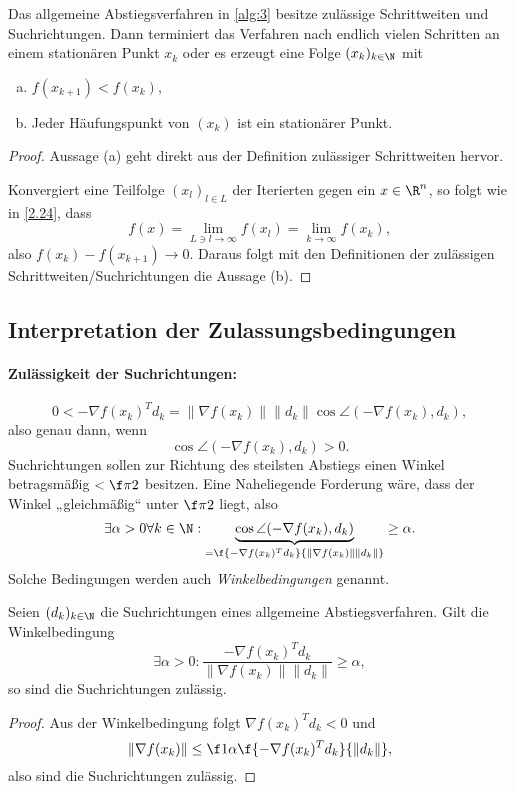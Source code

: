 \begin{st} \label{2.29}
	Das allgemeine Abstiegsverfahren in \ref{alg:3} besitze zulässige Schrittweiten und Suchrichtungen.
	Dann terminiert das Verfahren nach endlich vielen Schritten an einem stationären Punkt $x_k$ oder es erzeugt eine Folge $(x_k)_{k\in\N}$ mit
	\begin{enumerate}[(a)]
		\item
			$f(x_{k+1}) < f(x_k)$,
		\item
			Jeder Häufungspunkt von $(x_k)$ ist ein stationärer Punkt.
	\end{enumerate}
	\begin{proof}
		Aussage (a) geht direkt aus der Definition zulässiger Schrittweiten hervor.

		Konvergiert eine Teilfolge $(x_l)_{l\in L}$ der Iterierten gegen ein $x \in \R^n$, so folgt wie in \ref{2.24}, dass
		\[
			f(x) = \lim_{L \ni l \to \infty} f(x_l) = \lim_{k \to \infty} f(x_k),
		\]
		also $f(x_k) - f(x_{k+1}) \to 0$.
		Daraus folgt mit den Definitionen der zulässigen Schrittweiten/Suchrichtungen die Aussage (b).
	\end{proof}
\end{st}

\subsection{Interpretation der Zulassungsbedingungen}

\paragraph{Zulässigkeit der Suchrichtungen:}
\[
	0 <
	-\nabla f(x_k)^T d_k
	= \|\nabla f(x_k)\|\|d_k\| \cos \angle(-\nabla f(x_k), d_k),
\]
also genau dann, wenn
\[
	\cos \angle(-\nabla f(x_k), d_k) > 0.
\]
Suchrichtungen sollen zur Richtung des steilsten Abstiegs einen Winkel betragsmäßig $< \f \pi2$ besitzen.
Eine Naheliegende Forderung wäre, dass der Winkel „gleichmäßig“ unter $\f \pi 2$ liegt, also
\[
	\exists \alpha > 0 \forall k\in \N : \underbrace{\cos \angle(-\nabla f(x_k), d_k)}_{= \f {-\nabla f(x_k)^T d_k}{\|\nabla f(x_k)\|\|d_k\|}} \ge \alpha.
\]
Solche Bedingungen werden auch \emph{Winkelbedingungen} genannt.

\begin{st} \label{2.30}
	Seien $(d_k)_{k\in\N}$  die Suchrichtungen eines allgemeine Abstiegsverfahren.
	Gilt die Winkelbedingung
	\[
		\exists \alpha > 0:
		\dfrac {-\nabla  f(x_k)^T d_k}{\|\nabla f(x_k)\|\|d_k\|} \ge \alpha,
	\]
	so sind die Suchrichtungen zulässig.
	\begin{proof}
		Aus der Winkelbedingung folgt $\nabla f(x_k)^T d_k < 0$ und
		\[
			\|\nabla f(x_k)\|
			\le \f 1\alpha \f {-\nabla f(x_k)^T d_k}{\|d_k\|},
		\]
		also sind die Suchrichtungen zulässig.
	\end{proof}
\end{st}

